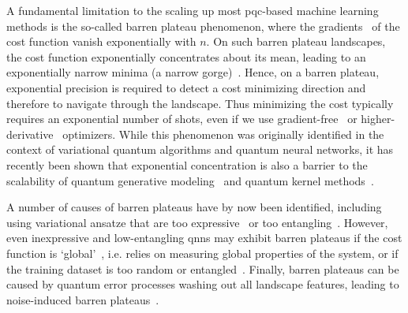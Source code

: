A fundamental limitation to the scaling up most \gls{pqc}-based machine learning methods is the so-called barren plateau phenomenon, where the gradients~\cite{2018NatCo...9.4812M} of the cost function vanish exponentially with $n$. 
On such barren plateau landscapes, the cost function exponentially concentrates about its mean, leading to an exponentially narrow minima (a narrow gorge)~\cite{arrasmith2021equivalence}.  Hence, on a barren plateau, exponential precision is required to detect a cost minimizing direction and
therefore to navigate through the landscape.
Thus minimizing the cost typically requires an exponential number of shots, even if we use gradient-free~\cite{2020arXiv201112245A} or higher-derivative~\cite{cerezo2021higher} optimizers. While this phenomenon was originally identified in the context of variational quantum algorithms and quantum neural networks, it has recently been shown that  exponential concentration is also a barrier to the scalability of quantum generative modeling~\cite{rudolph2023trainability} and quantum kernel methods~\cite{thanasilp2022exponential}. 

A number of causes of barren plateaus have by now been identified, including using variational ansatze that are too expressive~\cite{2018NatCo...9.4812M,2022PRXQ....3a0313H, larocca2021diagnosing, tangpanitanon2020expressibility} or too entangling~\cite{PRXQuantum.2.040316, sharma2020trainability, patti2020entanglement}. However, even inexpressive and low-entangling \gls{qnn}s may exhibit barren plateaus if the cost function is `global'~\cite{2021NatCo..12.1791C}, i.e. relies on measuring global properties of the system, or if the training dataset is too random or entangled~\cite{PhysRevLett.126.190501, 2021arXiv211014753T, li2022concentration, 2022arXiv221101477L}. Finally, barren plateaus can be caused by quantum error processes washing out all landscape features, leading to noise-induced barren plateaus~\cite{2021NatCo..12.6961W,franca2020limitations}. 

